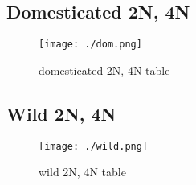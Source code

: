 \documentclass[a4paper, twocolumn]{article}
\begin{document}
\subsection{Domesticated 2N, 4N}
\label{sec:org55f6d89}
\begin{figure}[htbp]
\centering
\texttt{[image: ./dom.png]}
\caption{\label{fig:org778d7cd}
domesticated 2N, 4N table}
\end{figure}

\clearpage
\subsection{Wild 2N, 4N}
\label{sec:org6a1967a}
\begin{figure}[htbp]
\centering
\texttt{[image: ./wild.png]}
\caption{\label{fig:org11bf147}
wild 2N, 4N  table}
\end{figure}

\clearpage



\end{document}
